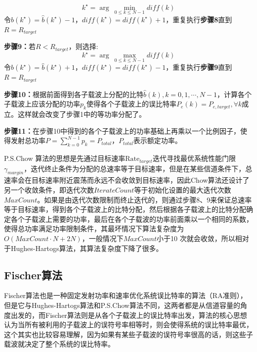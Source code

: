 \begin{description}
\begin{equation}
k^{\star} =\arg\ \underset{0\leq k\leq N-1}{\min}diff(k)
\end{equation}
令$\hat{b}(k^{\star})=\hat{b}(k^{\star})-1$，$diff(k^{\star})=diff(k^{\star})+1$，重复执行\textbf{步骤8}直到$R=R_{target}$
\item{\bf{步骤9：}}若$R<R_{target}$，则选择:
\begin{equation}
k^{\star} =\arg\ \underset{0\leq k\leq N-1}{\max}diff(k)
\end{equation}
令$\hat{b}(k^{\star})=\hat{b}(k^{\star})+1$，$diff(k^{\star})=diff(k^{\star})-1$，重复执行\textbf{步骤9}直到$R=R_{target}$
\item{\bf{步骤10：}}根据前面得到各子载波上分配的比特$\hat{b}(k), k=0,1,\cdots,N-1$，计算各个子载波上应该分配的功率$p_k$使得各个子载波上的误比特率$P_e(k)=P_{e,target}, \forall k$成立。这样就会改变了步骤1中的等功率分配了。
\item{\bf{步骤11：}}在步骤10中得到的各个子载波上的功率基础上再乘以一个比例因子，使得发射总功率$P=\sum_{k=0}^{N-1}p_k=P_{total}$，$P_{total}$表示额定功率。
\end{description}

P.S.Chow 算法的思想是先通过目标速率$\text{Rate}_{target}$迭代寻找最优系统性能门限$\gamma_{margin}$，迭代终止条件为分配的总速率等于目标速率，但是在某些信道条件下，总速率会在目标速率附近震荡而永远不会收敛到目标速率，因此Chow算法还设计了另一个收敛条件，即迭代次数$IterateCount$等于初始化设置的最大迭代次数$MaxCount$。如果是由迭代次数限制而终止迭代的，则通过步骤8、9来保证总速率等于目标速率，得到各个子载波上的比特分配，然后根据各子载波上的比特分配确定各个子载波上需要的功率，最后在各个子载波的功率前面乘以一个相同的系数，使得总功率满足功率限制条件，其最坏情况下算法复杂度为$O(MaxCount\cdot N+2N)$，一般情况下$MaxCount$小于10 次就会收敛，所以相对于Hughes-Hartogs算法，其算法复杂度下降了很多。
\subsection{Fischer算法}
Fischer算法\cite{fischer1996new}也是一种固定发射功率和速率优化系统误比特率的算法（RA准则），但是它与Hughes-Hartogs算法和P.S.Chow算法不同，这两者都是从信道容量的角度出发的，而Fischer算法则是从各个子载波上的误比特率出发，算法的核心思想认为当所有被利用的子载波上的误符号率相等时，则会使得系统的误比特率最优，这个其实也比较容易理解，因为如果有某些子载波的误符号率很高的话，则这些子载波就决定了整个系统的误比特率。

